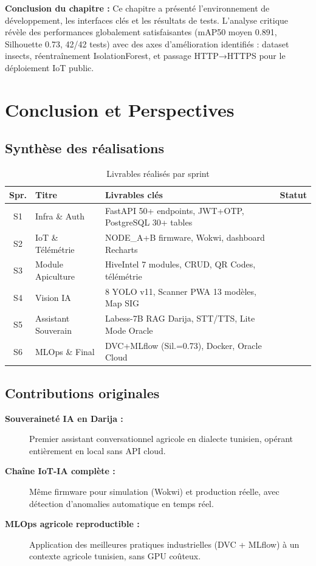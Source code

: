 \documentclass[12pt,a4paper,oneside]{report}
\newcommand{\yes}{\ding{52}}
\begin{document}
\medskip
\noindent\textbf{Conclusion du chapitre :} Ce chapitre a présenté l'environnement de
développement, les interfaces clés et les résultats de tests. L'analyse critique révèle
des performances globalement satisfaisantes (mAP50 moyen 0.891, Silhouette 0.73,
42/42 tests) avec des axes d'amélioration identifiés : dataset insects, réentraînement
IsolationForest, et passage HTTP→HTTPS pour le déploiement IoT public.

\chapter{Conclusion et Perspectives}

\section{Synthèse des réalisations}

\begin{table}[H]\centering
\caption{Livrables réalisés par sprint}
\label{tab:livr}
\begin{tabular}{clll}
\toprule
\textbf{Spr.}&\textbf{Titre}&\textbf{Livrables clés}&\textbf{Statut}\\
\midrule
S1&Infra \& Auth      &FastAPI 50+ endpoints, JWT+OTP, PostgreSQL 30+ tables&\yes\\
S2&IoT \& Télémétrie  &NODE\_A+B firmware, Wokwi, dashboard Recharts       &\yes\\
S3&Module Apiculture  &HiveIntel 7 modules, CRUD, QR Codes, télémétrie       &\yes\\
S4&Vision IA          &8 YOLO v11, Scanner PWA 13 modèles, Map SIG           &\yes\\
S5&Assistant Souverain&Labess-7B RAG Darija, STT/TTS, Lite Mode Oracle       &\yes\\
S6&MLOps \& Final     &DVC+MLflow (Sil.=0.73), Docker, Oracle Cloud          &\yes\\
\bottomrule
\end{tabular}
\end{table}

\section{Contributions originales}

\begin{description}
  \item[\textbf{Souveraineté IA en Darija :}] Premier assistant conversationnel
        agricole en dialecte tunisien, opérant entièrement en local sans API cloud.
  \item[\textbf{Chaîne IoT-IA complète :}] Même firmware pour simulation (Wokwi)
        et production réelle, avec détection d'anomalies automatique en temps réel.
  \item[\textbf{MLOps agricole reproductible :}] Application des meilleures pratiques
        industrielles (DVC + MLflow) à un contexte agricole tunisien, sans GPU coûteux.
\end{description}
\end{document}
